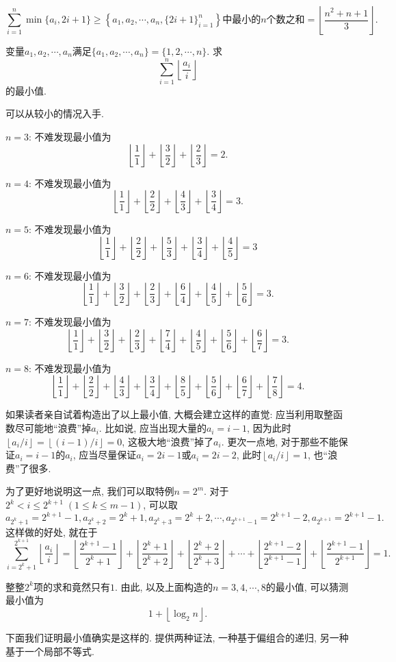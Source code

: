 \documentclass[lang=cn,12pt,thmcnt=section]{elegantbook}
\newcommand{\fl}[1]{\left\lfloor #1\right\rfloor}
\begin{document}
\begin{solution}
\[\sum_{i=1}^{n}\min\{a_{i},2i+1\}\geq\left\{a_{1},a_{2},\cdots,a_{n},\{2i+1\}_{i=1}^n\right\}\text{中最小的}n\text{个数之和}=\fl{\frac{n^{2}+n+1}{3}}.\]
\end{solution}

\begin{example}
变量$ a_{1},a_{2},\cdots,a_{n}$满足$\{a_{1},a_{2},\cdots,a_{n}\}=\{1,2,\cdots,n\}$. 求
\[\sum_{i=1}^n\fl{\frac{a_i}{i}}\]
的最小值. 
\end{example}

\begin{analysis}
可以从较小的情况入手. \par
$n=3$: 不难发现最小值为
\[\fl{\frac{1}{1}}+\fl{\frac{3}{2}}+\fl{\frac{2}{3}}=2.\]\par 
$n=4$: 不难发现最小值为
\[\fl{\frac{1}{1}}+\fl{\frac{2}{2}}+\fl{\frac{4}{3}}+\fl{\frac{3}{4}}=3.\]\par
$n=5$: 不难发现最小值为
\[\fl{\frac{1}{1}}+\fl{\frac{2}{2}}+\fl{\frac{5}{3}}+\fl{\frac{3}{4}}+\fl{\frac{4}{5}}=3\]\par
$n=6$: 不难发现最小值为
\[\fl{\frac{1}{1}}+\fl{\frac{3}{2}}+\fl{\frac{2}{3}}+\fl{\frac{6}{4}}+\fl{\frac{4}{5}}+\fl{\frac{5}{6}}=3.\]\par
$n=7$: 不难发现最小值为
\[\fl{\frac{1}{1}}+\fl{\frac{3}{2}}+\fl{\frac{2}{3}}+\fl{\frac{7}{4}}+\fl{\frac{4}{5}}+\fl{\frac{5}{6}}+\fl{\frac{6}{7}}=3.\]\par
$n=8$: 不难发现最小值为
\[\fl{\frac{1}{1}}+\fl{\frac{2}{2}}+\fl{\frac{4}{3}}+\fl{\frac{3}{4}}+\fl{\frac{8}{5}}+\fl{\frac{5}{6}}+\fl{\frac{6}{7}}+\fl{\frac{7}{8}}=4.\]\par
如果读者亲自试着构造出了以上最小值, 大概会建立这样的直觉: 应当利用取整函数尽可能地“浪费”掉$a_i$. 比如说, 应当出现大量的$a_i=i-1$, 因为此时$\fl{a_i/i}=\fl{(i-1)/i}=0$, 这极大地“浪费”掉了$a_i$. 更次一点地, 对于那些不能保证$a_i=i-1$的$a_i$, 应当尽量保证$a_i=2i-1$或$a_i=2i-2$, 此时$\fl{a_i/i}=1$, 也“浪费”了很多.\par
为了更好地说明这一点, 我们可以取特例$n=2^m$. 对于$2^k<i\le 2^{k+1}\;(1\le k\le m-1)$, 可以取
\[a_{2^k+1}=2^{k+1}-1,a_{2^k+2}=2^k+1,a_{2^k+3}=2^k+2,\cdots,a_{2^{k+1}-1}=2^{k+1}-2,a_{2^{k+1}}=2^{k+1}-1.\]
这样做的好处, 就在于
\[\sum_{i=2^k+1}^{2^{k+1}}\fl{\frac{a_i}{i}}=\fl{\frac{2^{k+1}-1}{2^k+1}}+\fl{\frac{2^k+1}{2^k+2}}+\fl{\frac{2^k+2}{2^k+3}}+\cdots+\fl{\frac{2^{k+1}-2}{2^{k+1}-1}}+\fl{\frac{2^{k+1}-1}{2^{k+1}}}=1.\]\par 
整整$2^k$项的求和竟然只有$1$. 由此, 以及上面构造的$n=3,4,\cdots,8$的最小值, 可以猜测最小值为
\[1+\fl{\log_2 n}.\]\par
下面我们证明最小值确实是这样的. 提供两种证法, 一种基于偏组合的递归, 另一种基于一个局部不等式.
\end{analysis}
\end{document}
